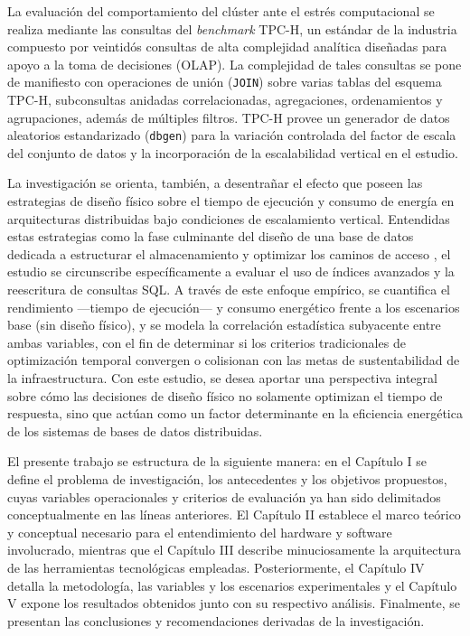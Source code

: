 \documentclass[12pt, letter paper]{report}
\begin{document}
  La evaluación del comportamiento del clúster ante el estrés computacional se
  realiza mediante las consultas del \textit{benchmark} TPC-H, un estándar de la
  industria compuesto por veintidós consultas de alta complejidad analítica
  diseñadas para apoyo a la toma de decisiones (OLAP). La complejidad de tales
  consultas se pone de manifiesto con operaciones de unión (\texttt{JOIN}) sobre
  varias tablas del esquema TPC-H, subconsultas anidadas correlacionadas,
  agregaciones, ordenamientos y agrupaciones, además de múltiples filtros. TPC-H
  provee un generador de datos aleatorios estandarizado (\texttt{dbgen})
  \cite{transactionprocessingperformancecounciltpctpc2022} para la variación
  controlada del factor de escala del conjunto de datos y la incorporación de la
  escalabilidad vertical en el estudio.

  La investigación se orienta, también, a desentrañar el efecto que poseen las
  estrategias de diseño físico sobre el tiempo de ejecución y consumo de energía
  en arquitecturas distribuidas bajo condiciones de escalamiento vertical.
  Entendidas estas estrategias como la fase culminante del diseño de una base de
  datos dedicada a estructurar el almacenamiento y optimizar los caminos de
  acceso \cite{silberschatz2019database, elmasri2016fundamentals,
  connolly2014database, ramakrishnan2003database}, el estudio se circunscribe
  específicamente a evaluar el uso de índices avanzados y la reescritura de
  consultas SQL. A través de este enfoque empírico, se cuantifica el
  rendimiento ---tiempo de ejecución--- y consumo energético frente a los
  escenarios base (sin diseño físico), y se modela la correlación estadística
  subyacente entre ambas variables, con el fin de determinar si los criterios
  tradicionales de optimización temporal convergen o colisionan con las metas de
  sustentabilidad de la infraestructura. Con este estudio, se desea aportar una
  perspectiva integral sobre cómo las decisiones de diseño físico no solamente
  optimizan el tiempo de respuesta, sino que actúan como un factor determinante
  en la eficiencia energética de los sistemas de bases de datos distribuidas.

  El presente trabajo se estructura de la siguiente manera: en el Capítulo I se
  define el problema de investigación, los antecedentes y los objetivos
  propuestos, cuyas variables operacionales y criterios de evaluación ya han
  sido delimitados conceptualmente en las líneas anteriores. El Capítulo II
  establece el marco teórico y conceptual necesario para el entendimiento del
  hardware y software involucrado, mientras que el Capítulo III describe
  minuciosamente la arquitectura de las herramientas tecnológicas empleadas.
  Posteriormente, el Capítulo IV detalla la metodología, las variables y los
  escenarios experimentales y el Capítulo V expone los resultados obtenidos
  junto con su respectivo análisis. Finalmente, se presentan las conclusiones y
  recomendaciones derivadas de la investigación.
\end{document}
